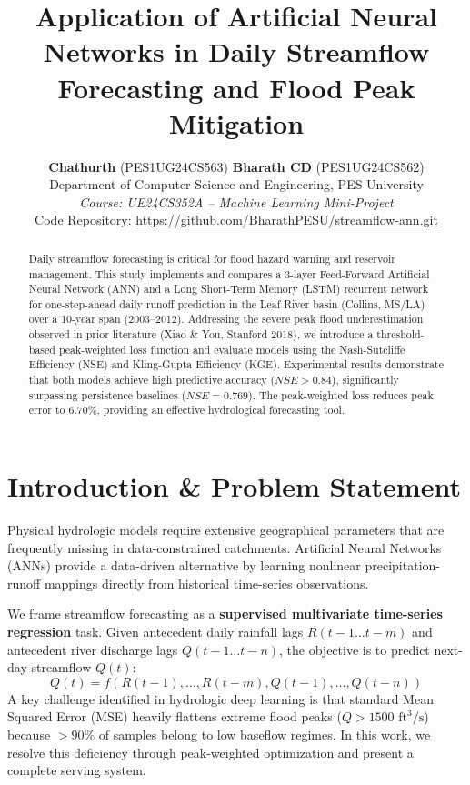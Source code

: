 \documentclass[10pt,twocolumn]{article}
\title{\vspace{-0.4in}\textbf{\Large Application of Artificial Neural Networks in Daily Streamflow Forecasting and Flood Peak Mitigation}}
\author{
    \textbf{Chathurth} (PES1UG24CS563) \quad \textbf{Bharath CD} (PES1UG24CS562) \\
    Department of Computer Science and Engineering, PES University \\
    \textit{Course: UE24CS352A -- Machine Learning Mini-Project} \\
    \small Code Repository: \url{https://github.com/BharathPESU/streamflow-ann.git}
}
\date{}
\begin{document}
\maketitle
\vspace{-0.3in}

\begin{abstract}
\noindent Daily streamflow forecasting is critical for flood hazard warning and reservoir management. This study implements and compares a 3-layer Feed-Forward Artificial Neural Network (ANN) and a Long Short-Term Memory (LSTM) recurrent network for one-step-ahead daily runoff prediction in the Leaf River basin (Collins, MS/LA) over a 10-year span (2003--2012). Addressing the severe peak flood underestimation observed in prior literature (Xiao \& You, Stanford 2018), we introduce a threshold-based peak-weighted loss function and evaluate models using the Nash-Sutcliffe Efficiency (NSE) and Kling-Gupta Efficiency (KGE). Experimental results demonstrate that both models achieve high predictive accuracy ($NSE > 0.84$), significantly surpassing persistence baselines ($NSE = 0.769$). The peak-weighted loss reduces peak error to 6.70\%, providing an effective hydrological forecasting tool.
\end{abstract}

\section{Introduction \& Problem Statement}
Physical hydrologic models require extensive geographical parameters that are frequently missing in data-constrained catchments. Artificial Neural Networks (ANNs) provide a data-driven alternative by learning nonlinear precipitation-runoff mappings directly from historical time-series observations.

We frame streamflow forecasting as a \textbf{supervised multivariate time-series regression} task. Given antecedent daily rainfall lags $R(t-1 \dots t-m)$ and antecedent river discharge lags $Q(t-1 \dots t-n)$, the objective is to predict next-day streamflow $Q(t)$:
\begin{equation}
Q(t) = f\left(R(t-1), \dots, R(t-m), Q(t-1), \dots, Q(t-n)\right)
\end{equation}
A key challenge identified in hydrologic deep learning is that standard Mean Squared Error (MSE) heavily flattens extreme flood peaks ($Q > 1500\text{ ft}^3/\text{s}$) because $>90\%$ of samples belong to low baseflow regimes. In this work, we resolve this deficiency through peak-weighted optimization and present a complete serving system.
\end{document}

